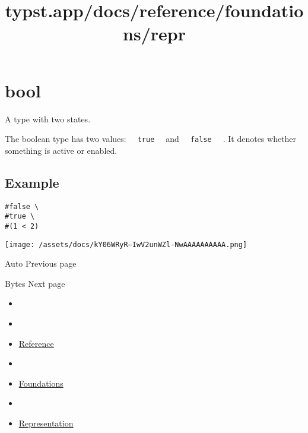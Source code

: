 \section{\texorpdfstring{{ bool }}{ bool }}\label{summary}

A type with two states.

The boolean type has two values:
\texttt{\ }{\texttt{\ true\ }}\texttt{\ } and
\texttt{\ }{\texttt{\ false\ }}\texttt{\ } . It denotes whether
something is active or enabled.

\subsection{Example}\label{example}

\begin{verbatim}
#false \
#true \
#(1 < 2)
\end{verbatim}

\texttt{[image: /assets/docs/kY06WRyR--IwV2unWZl-NwAAAAAAAAAA.png]}

\href{/docs/reference/foundations/auto/}{\pandocbounded{}}

{ Auto } { Previous page }

\href{/docs/reference/foundations/bytes/}{\pandocbounded{}}

{ Bytes } { Next page }


\title{typst.app/docs/reference/foundations/repr}

\begin{itemize}
\tightlist
\item
  \href{/docs}{}
\item
  
\item
  \href{/docs/reference/}{Reference}
\item
  
\item
  \href{/docs/reference/foundations/}{Foundations}
\item
  
\item
  \href{/docs/reference/foundations/repr/}{Representation}
\end{itemize}

